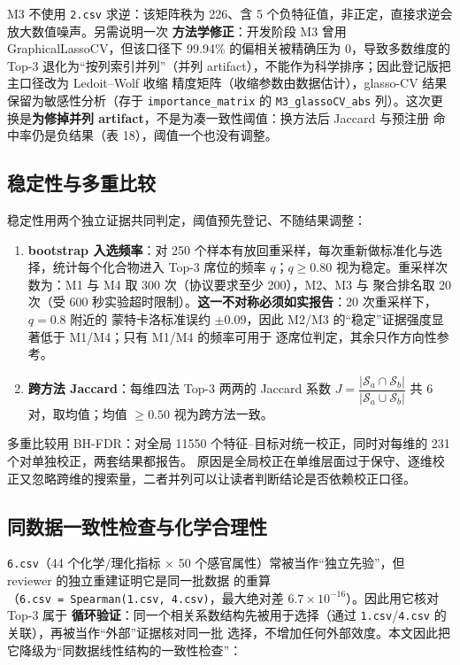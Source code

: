\documentclass[
  a4paper,12pt]{article}
\providecommand{\tightlist}{%
  \setlength{\itemsep}{0pt}\setlength{\parskip}{0pt}}
\begin{document}
M3 不使用 \texttt{2.csv} 求逆：该矩阵秩为 226、含 5
个负特征值，非正定，直接求逆会放大数值噪声。另需说明一次
\textbf{方法学修正}：开发阶段 M3 曾用 GraphicalLassoCV，但该口径下
99.94\% 的偏相关被精确压为 0，导致多数维度的 Top-3
退化为``按列索引并列''（并列
artifact），不能作为科学排序；因此登记版把主口径改为 Ledoit--Wolf 收缩
精度矩阵（收缩参数由数据估计），glasso-CV 结果保留为敏感性分析（存于
\texttt{importance\_matrix} 的 \texttt{M3\_glassoCV\_abs}
列）。这次更换是\textbf{为修掉并列
artifact}，不是为凑一致性阈值：换方法后 Jaccard 与预注册
命中率仍是负结果（表 18），阈值一个也没有调整。

\subsection{稳定性与多重比较}\label{ux7a33ux5b9aux6027ux4e0eux591aux91cdux6bd4ux8f83}

稳定性用两个独立证据共同判定，阈值预先登记、不随结果调整：

\begin{enumerate}
\def\labelenumi{\arabic{enumi}.}
\tightlist
\item
  \textbf{bootstrap 入选频率}：对 250
  个样本有放回重采样，每次重新做标准化与选择，统计每个化合物进入 Top-3
  席位的频率 \(q\)；\(q\ge0.80\) 视为稳定。重采样次数为：M1 与 M4 取 300
  次（协议要求至少 200），M2、M3 与 聚合排名取 20 次（受 600
  秒实验超时限制）。\textbf{这一不对称必须如实报告}：20
  次重采样下，\(q=0.8\) 附近的 蒙特卡洛标准误约 \(\pm0.09\)，因此 M2/M3
  的``稳定''证据强度显著低于 M1/M4；只有 M1/M4 的频率可用于
  逐席位判定，其余只作方向性参考。
\item
  \textbf{跨方法 Jaccard}：每维四法 Top-3 两两的 Jaccard 系数
  \(J=\dfrac{|\mathcal{S}_a\cap\mathcal{S}_b|}
  {|\mathcal{S}_a\cup\mathcal{S}_b|}\) 共 6 对，取均值；均值 \(\ge0.50\)
  视为跨方法一致。
\end{enumerate}

多重比较用 BH-FDR：对全局 11550 个特征--目标对统一校正，同时对每维的 231
个对单独校正，两套结果都报告。
原因是全局校正在单维层面过于保守、逐维校正又忽略跨维的搜索量，二者并列可以让读者判断结论是否依赖校正口径。

\subsection{同数据一致性检查与化学合理性}\label{ux540cux6570ux636eux4e00ux81f4ux6027ux68c0ux67e5ux4e0eux5316ux5b66ux5408ux7406ux6027}

\texttt{6.csv}（44 个化学/理化指标 × 50
个感官属性）常被当作``独立先验''，但 reviewer
的独立重建证明它是同一批数据
的重算（\texttt{6.csv\ =\ Spearman(1.csv,\ 4.csv)}，最大绝对差
\(6.7\times10^{-16}\)）。因此用它核对 Top-3 属于
\textbf{循环验证}：同一个相关系数结构先被用于选择（通过
\texttt{1.csv}/\texttt{4.csv} 的关联），再被当作``外部''证据核对同一批
选择，不增加任何外部效度。本文因此把它降级为``同数据线性结构的一致性检查''：
\end{document}
